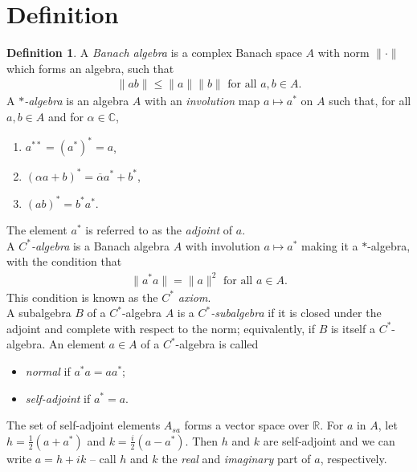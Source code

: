 \documentclass[12pt,a4paper]{report}
\theoremstyle{plain}
\theoremstyle{definition}
\newtheorem{defn}{Definition}
\newcommand{\1}{\mathbbm{1}}
\newcommand{\C}{\mathbb{C}}
\newcommand{\R}{\mathbb{R}}
\begin{document}
\section{Definition}
\begin{defn}
	A \emph{Banach algebra} is a complex Banach space $A$ with norm $\|\cdot\|$ which forms an 
	algebra, such that 
	\begin{align*}
		\|ab\| \leq \|a\| \|b\| \mbox{ for all } a,b \in A.
	\end{align*}
	A \emph{$\ast$-algebra} is an algebra $A$ with an \emph{involution} map 
	$a \mapsto a^\ast$ on $A$ such that, for all $a,b \in A$ and for $\alpha \in \C$,
	
	\begin{enumerate}
		\item $a^{\ast\ast} = (a^\ast)^\ast = a$,
		\item $(\alpha a+b)^\ast = \overline{\alpha} a^\ast + b^\ast$,
		\item $(ab)^\ast = b^\ast a^\ast$.
	\end{enumerate}
	The element $a^\ast$ is referred to as the \emph{adjoint} of $a$. 		\\
	A \emph{$C^\ast$-algebra} is a Banach algebra $A$ with involution $a \mapsto a^\ast$ making it a 
	$\ast$-algebra, with the condition that
	\begin{align*}
		\|a ^\ast a\| = \|a\|^2 \mbox{ for all } a \in A.
	\end{align*}
	This condition is known as the \emph{$C^\ast$ axiom}.\\
	A subalgebra $B$ of a $C^\ast$-algebra $A$ is a \emph{$C^\ast$-subalgebra} if it is closed under the 
	adjoint and complete with respect to the norm; equivalently, if $B$ is itself a $C^\ast$-algebra.
	An element $a\in A$ of a $C^\ast$-algebra is called
	\begin{itemize}
		\item	\emph{normal} if $a^\ast a=aa^\ast$;
		\item 	\emph{self-adjoint} if $a^\ast=a$.
	\end{itemize}
\end{defn}
The set of self-adjoint elements $A_{sa}$ forms a vector space over $\R$.
For $a$ in $A$, let $h=\tfrac{1}{2}(a+a^\ast)$ and $k=\tfrac{i}{2}(a-a^\ast)$. Then $h$ and $k$ are 
self-adjoint and we can write $a=h+ik$ -- call $h$ and $k$ the \emph{real} and \emph{imaginary} part of
$a$, respectively.

\end{document}
